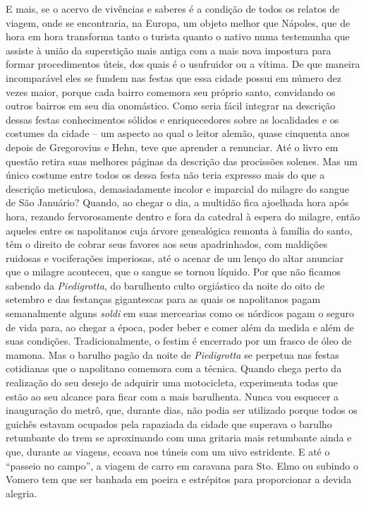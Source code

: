 E mais, se o acervo de vivências e saberes é a condição de todos os
relatos de viagem, onde se encontraria, na Europa, um objeto melhor que
Nápoles, que de hora em hora transforma tanto o turista quanto o nativo
numa testemunha que assiste à união da superstição mais antiga com a
mais nova impostura para formar procedimentos úteis, dos quais é o
usufruidor ou a vítima. De que maneira incomparável eles se fundem nas
festas que essa cidade possui em número dez vezes maior, porque cada
bairro comemora seu próprio santo, convidando os outros bairros em seu
dia onomástico. Como seria fácil integrar na descrição dessas festas
conhecimentos sólidos e enriquecedores sobre as localidades e os
costumes da cidade -- um aspecto ao qual o leitor alemão, quase
cinquenta anos depois de Gregorovius e Hehn, teve que aprender a
renunciar. Até o livro em questão retira suas melhores páginas da
descrição das procissões solenes. Mas um único costume entre todos os
dessa festa não teria expresso mais do que a descrição meticulosa,
demasiadamente incolor e imparcial do milagre do sangue de São Januário?
Quando, ao chegar o dia, a multidão fica ajoelhada hora após hora,
rezando fervorosamente dentro e fora da catedral à espera do milagre,
então aqueles entre os napolitanos cuja árvore genealógica remonta à
família do santo, têm o direito de cobrar seus favores aos seus
apadrinhados, com maldições ruidosas e vociferações imperiosas, até o
acenar de um lenço do altar anunciar que o milagre aconteceu, que o
sangue se tornou líquido. Por que não ficamos sabendo da
\emph{Piedigrotta}, do barulhento culto orgiástico da noite do oito de
setembro e das festanças gigantescas para as quais os napolitanos pagam
semanalmente alguns \emph{soldi} em suas mercearias como os nórdicos
pagam o seguro de vida para, ao chegar a época, poder beber e comer além
da medida e além de suas condições. Tradicionalmente, o festim é
encerrado por um frasco de óleo de mamona. Mas o barulho pagão da noite
de \emph{Piedigrotta} se perpetua nas festas cotidianas que o napolitano
comemora com a técnica. Quando chega perto da realização do seu desejo
de adquirir uma motocicleta, experimenta todas que estão ao seu alcance
para ficar com a mais barulhenta. Nunca vou esquecer a inauguração do
metrô, que, durante dias, não podia ser utilizado porque todos os
guichês estavam ocupados pela rapaziada da cidade que superava o barulho
retumbante do trem se aproximando com uma gritaria mais retumbante ainda
e que, durante as viagens, ecoava nos túneis com um uivo estridente. E
até o ``passeio no campo'', a viagem de carro em caravana para Sto. Elmo
ou subindo o Vomero tem que ser banhada em poeira e estrépitos para
proporcionar a devida alegria.

